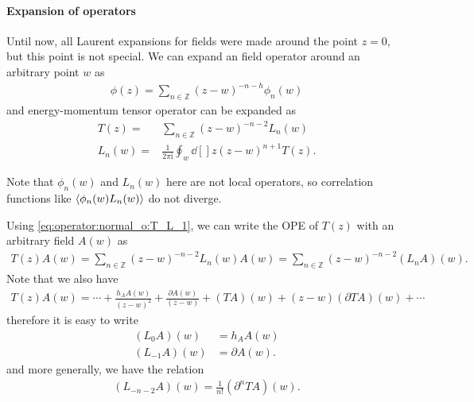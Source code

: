 \documentclass[10pt]{article}
\newcommand{\ii}{\mathrm{i}}
\begin{document}
\paragraph{Expansion of operators}
Until now, all Laurent expansions for fields were made around the point $z=0$, but this point is not special.
We can expand an field operator around an arbitrary point $w$ as
\begin{align}
    \phi(z)=\sum_{n\in\mathbb{Z}}(z-w)^{-n-h}\phi_n(w)
\end{align}
and energy-momentum tensor operator can be expanded as
\begin{subequations}
    \begin{align}
        T(z)=   & \sum_{n\in\mathbb{Z}}(z-w)^{-n-2}L_n(w)  \label{eq:operator:normal_o:T_L_1}        \\
        L_n(w)= & \frac{1}{2\pi\ii}\oint_w\dd[]{z}(z-w)^{n+1}T(z).
    \end{align}
\end{subequations}
\begin{remark}
    Note that $\phi_n(w)$ and $L_n(w)$ here are not local operators, so correlation functions like $\expval{\phi_n(w)L_n(w)}$ do not diverge.
\end{remark}


Using \cref{eq:operator:normal_o:T_L_1}, we can write the OPE of $T(z)$ with an arbitrary field $A(w)$ as 
\begin{align}
    T(z)A(w)=\sum_{n\in\mathbb{Z}}(z-w)^{-n-2}L_n(w)A(w)=\sum_{n\in\mathbb{Z}}(z-w)^{-n-2}(L_n A)(w).\label{eq:operator:normal_o:T_A_L_A}
\end{align}
Note that we also have 
\begin{align}
    T(z)A(w)=\cdots+\frac{h_A A(w)}{(z-w)^2}+\frac{\partial A(w)}{(z-w)}+(TA)(w)+(z-w)(\partial TA)(w)+\cdots
\end{align}
therefore it is easy to write 
\begin{subequations}
    \begin{align}
        (L_0 A)(w)&=h_A A(w)\\
        (L_{-1}A)(w)&=\partial A(w).
    \end{align}
\end{subequations}
and more generally, we have the relation 
\begin{align}
    (L_{-n-2}A)(w)=\frac{1}{n!}(\partial^n TA)(w).
\end{align}
\end{document}
